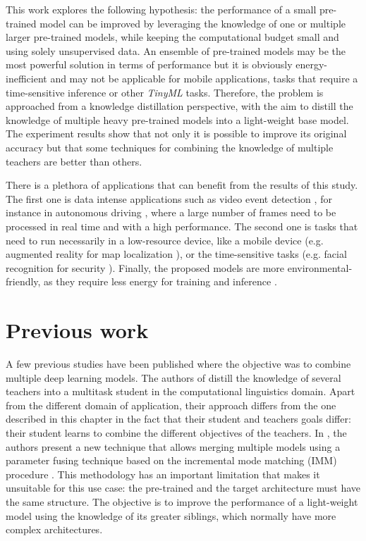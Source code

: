   This work explores the following hypothesis: the performance of a small pre-trained model can be improved by leveraging the knowledge of one or multiple larger pre-trained models, while keeping the computational budget small and using solely unsupervised data. An ensemble of pre-trained models may be the most powerful solution in terms of performance but it is obviously energy-inefficient and may not be applicable for mobile applications, tasks that require a time-sensitive inference \autocite{sanchez2020} or other \textit{TinyML} tasks. Therefore, the problem is approached from a knowledge distillation perspective, with the aim to distill the knowledge of multiple heavy pre-trained models into a light-weight base model. The experiment results show that not only it is possible to improve its original accuracy but that some techniques for combining the knowledge of multiple teachers are better than others. 
  
There is a plethora of applications that can benefit from the results of this study. The first one is data intense applications such as video event detection \autocite{chakraborty2021}, for instance in autonomous driving \autocite{swaminathan2019}, where a large number of frames need to be processed in real time and with a high performance. The second one is tasks that need to run necessarily in a low-resource device, like a mobile device (e.g. augmented reality for map localization \autocite{limmer2017}), or the time-sensitive tasks (e.g. facial recognition for security \autocite{aung2021}). Finally, the proposed models are more environmental-friendly, as they require less energy for training and inference \autocite{wu2022sustainable}.


 \section{Previous work} \label{sec:distillation_prevwork}	
 A few previous studies have been published where the objective was to combine multiple deep learning models. The authors of \autocite{liu2020b} distill the knowledge of several teachers into a multitask student in the computational linguistics domain. Apart from the different domain of application, their approach differs from the one described in this chapter in the fact that their student and teachers goals differ: their student learns to combine the different objectives of the teachers. In \autocite{geyer2019}, the authors present a new technique that allows merging multiple models using a parameter fusing technique based on the incremental mode matching (IMM) procedure \autocite{lee2017}. This methodology has an important limitation that makes it unsuitable for this use case: the pre-trained and the target architecture must have the same structure. The objective is to improve the performance of a light-weight model using the knowledge of its greater siblings, which normally have more complex architectures. 
 
